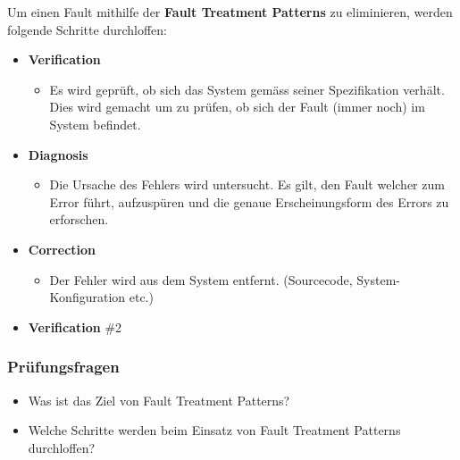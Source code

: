 Um einen Fault mithilfe der \textbf{Fault Treatment Patterns} zu eliminieren, werden folgende Schritte durchloffen:
\begin{itemize}
	\item \textbf{Verification}
	\begin{itemize}
		\item Es wird geprüft, ob sich das System gemäss seiner Spezifikation verhält. Dies wird gemacht um zu prüfen, ob sich der Fault (immer noch) im System befindet.
	\end{itemize}
	\item \textbf{Diagnosis}
	\begin{itemize}
		\item Die Ursache des Fehlers wird untersucht. Es gilt, den Fault welcher zum Error führt, aufzuspüren und die genaue Erscheinungsform des Errors zu erforschen.
	\end{itemize}
	\item \textbf{Correction}
	\begin{itemize}
		\item Der Fehler wird aus dem System entfernt. (Sourcecode, System-Konfiguration etc.)
	\end{itemize}
	\item \textbf{Verification} \#2
\end{itemize}

\subsubsection*{Prüfungsfragen}

\begin{itemize}
	\item Was ist das Ziel von Fault Treatment Patterns?
	\item Welche Schritte werden beim Einsatz von Fault Treatment Patterns durchloffen?
\end{itemize}

